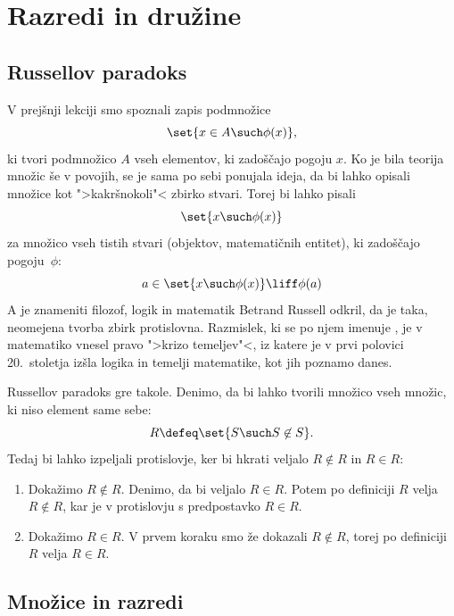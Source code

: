 \chapter{Razredi in družine}
\label{cha:razred-druzine}

\section{Russellov paradoks}

V prejšnji lekciji smo spoznali zapis podmnožice
%
\begin{equation*}
    \set{ x \in A \such \phi(x) },
\end{equation*}
%
ki tvori podmnožico $A$ vseh elementov, ki zadoščajo pogoju $x$. Ko je bila
teorija množic še v povojih, se je sama po sebi ponujala ideja, da bi lahko
opisali množice kot ">kakršnokoli"< zbirko stvari. Torej bi lahko pisali
%
\begin{equation*}
    \set{ x \such \phi(x) }
\end{equation*}
%
za množico vseh tistih stvari (objektov, matematičnih entitet), ki zadoščajo
pogoju~$\phi$:
%
\begin{equation*}
    a \in \set{ x \such \phi(x) } \liff \phi(a)
\end{equation*}
%
A je znameniti filozof, logik in matematik Betrand Russell odkril, 
da je taka, neomejena tvorba zbirk protislovna.
%
Razmislek, ki se po njem imenuje , je v matematiko vnesel pravo ">krizo
temeljev"<, iz katere je v prvi polovici 20.~stoletja izšla logika in
temelji matematike, kot jih poznamo danes.

Russellov paradoks gre takole. Denimo, da bi lahko tvorili množico vseh množic, ki niso element same
sebe:
%
\begin{equation*}
    R \defeq \set{ S \such S \not\in S }.
\end{equation*}
%
Tedaj bi lahko izpeljali protislovje, ker bi hkrati veljalo $R \not\in R$ in $R \in R$:
%
\begin{enumerate}
\item Dokažimo $R \not\in R$.
  Denimo, da bi veljalo $R \in R$. Potem po definiciji $R$ velja $R \not\in R$, kar
  je v protislovju s predpostavko $R \in R$.

\item
  Dokažimo $R \in R$. V prvem koraku smo že dokazali $R \not\in R$, torej po
  definiciji $R$ velja $R \in R$.
\end{enumerate}


\section{Množice in razredi}

